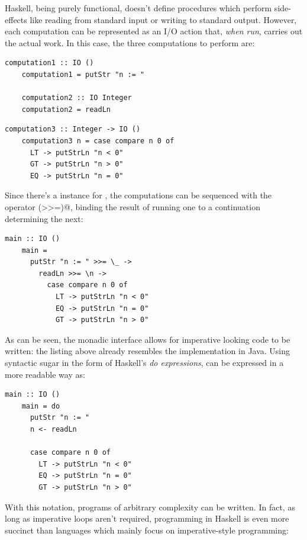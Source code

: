 \documentclass[UdineBachThesis,american,11pt]{PhdThesis}
\begin{document}
  Haskell, being purely functional, doesn't define procedures which perform
  side-effects like reading from standard input or writing to standard output.
  However, each computation can be represented as an I/O action that, \emph{when
  run}, carries out the actual work. In this case, the three computations to
  perform are:

  \begin{lstlisting}[gobble=4,basicstyle=\ttfamily\small]
    computation1 :: IO ()
    computation1 = putStr "n := "

    computation2 :: IO Integer
    computation2 = readLn
  \end{lstlisting}

  \newpage

  \begin{lstlisting}[gobble=4,basicstyle=\ttfamily\small]
    computation3 :: Integer -> IO ()
    computation3 n = case compare n 0 of
      LT -> putStrLn "n < 0"
      GT -> putStrLn "n > 0"
      EQ -> putStrLn "n = 0"
  \end{lstlisting}

  Since there's a \lstinline@Monad@ instance for \lstinline@IO@, the
  computations can be sequenced with the operator \lstinline@(>>=)@, binding the
  result of running one to a continuation determining the next:

  \begin{lstlisting}[gobble=4,basicstyle=\ttfamily\small]
    main :: IO ()
    main =
      putStr "n := " >>= \_ ->
        readLn >>= \n ->
          case compare n 0 of
            LT -> putStrLn "n < 0"
            EQ -> putStrLn "n = 0"
            GT -> putStrLn "n > 0"
  \end{lstlisting}

  As can be seen, the monadic interface allows for imperative looking code to be
  written: the listing above already resembles the implementation in Java. Using
  syntactic sugar in the form of Haskell's \emph{do expressions},
  \lstinline@main@ can be expressed in a more readable way as:

  \begin{lstlisting}[gobble=4,basicstyle=\ttfamily\small]
    main :: IO ()
    main = do
      putStr "n := "
      n <- readLn

      case compare n 0 of
        LT -> putStrLn "n < 0"
        EQ -> putStrLn "n = 0"
        GT -> putStrLn "n > 0"
  \end{lstlisting}

  With this notation, programs of arbitrary complexity can be written. In fact,
  as long as imperative loops aren't required, programming in Haskell is even
  more succinct than languages which mainly focus on imperative-style
  programming:
\end{document}
